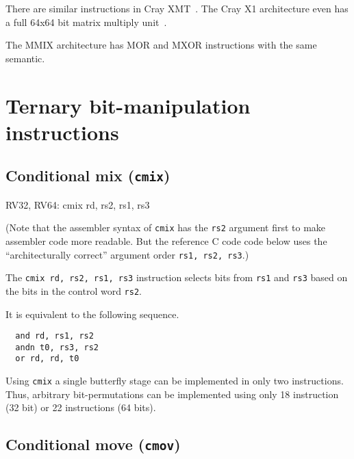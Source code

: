 There are similar instructions in Cray XMT~\cite{CrayXMT}. The Cray X1
architecture even has a full 64x64 bit matrix multiply unit~\cite{CrayX1}.

The MMIX architecture has MOR and MXOR instructions with the same semantic.~\cite[p.~182f]{Knuth4A}




\section{Ternary bit-manipulation instructions}


\subsection{Conditional mix ({\tt cmix})}

\begin{rvb}
  RV32, RV64:
    cmix rd, rs2, rs1, rs3
\end{rvb}

(Note that the assembler syntax of {\tt cmix} has the {\tt rs2} argument first
to make assembler code more readable. But the reference C code code below uses
the ``architecturally correct'' argument order {\tt rs1, rs2, rs3}.)

The {\tt cmix rd, rs2, rs1, rs3} instruction selects bits from {\tt rs1} and {\tt rs3} based
on the bits in the control word {\tt rs2}.



It is equivalent to the following sequence.

\begin{minipage}{\linewidth}
\begin{verbatim}
  and rd, rs1, rs2
  andn t0, rs3, rs2
  or rd, rd, t0
\end{verbatim}
\end{minipage}

Using {\tt cmix} a single butterfly stage can be implemented in only two
instructions. Thus, arbitrary bit-permutations can be implemented using only
18 instruction (32 bit) or 22 instructions (64 bits).

\subsection{Conditional move ({\tt cmov})}

